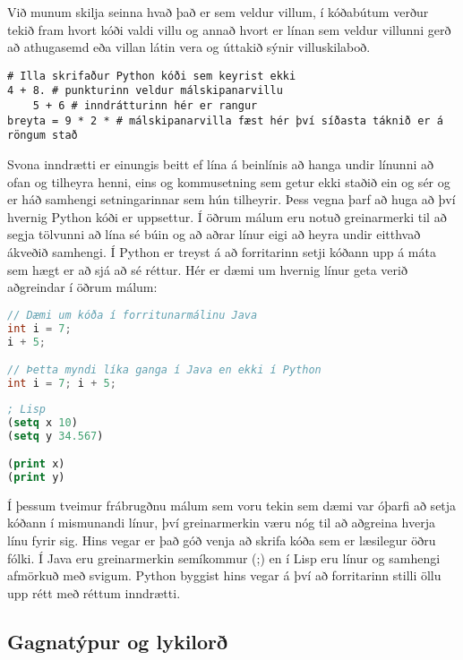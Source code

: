 Við munum skilja seinna hvað það er sem veldur villum, í kóðabútum verður tekið fram hvort kóði valdi villu og annað hvort er línan sem veldur villunni gerð að athugasemd eða villan látin vera og úttakið sýnir villuskilaboð.

\begin{lstlisting}[caption=Rangur Python kóði sem veldur villu, label=lst:inng-malskipanarvilla]
# Illa skrifaður Python kóði sem keyrist ekki
4 + 8. # punkturinn veldur málskipanarvillu
	5 + 6 # inndrátturinn hér er rangur
breyta = 9 * 2 * # málskipanarvilla fæst hér því síðasta táknið er á röngum stað
\end{lstlisting}

Svona inndrætti er einungis beitt ef lína á beinlínis að hanga undir línunni að ofan og tilheyra henni, eins og kommusetning sem getur ekki staðið ein og sér og er háð samhengi setningarinnar sem hún tilheyrir.
Þess vegna þarf að huga að því hvernig Python kóði er uppsettur. 
Í öðrum málum eru notuð greinarmerki til að segja tölvunni að lína sé búin og að aðrar línur eigi að heyra undir eitthvað ákveðið samhengi.
Í Python er treyst á að forritarinn setji kóðann upp á máta sem hægt er að sjá að sé réttur. 
Hér er dæmi um hvernig línur geta verið aðgreindar í öðrum málum:

\begin{lstlisting}[language=Java , caption=Dæmi um annað mál sem er strangt tagað og með greinarmerkjum]
// Dæmi um kóða í forritunarmálinu Java
int i = 7;
i + 5;

// Þetta myndi líka ganga í Java en ekki í Python
int i = 7; i + 5;
\end{lstlisting}

\begin{lstlisting}[language=Lisp, caption=Dæmi um annað mál sem byggir á afmörkuðu samhengi og er með greinarmerkjum]
; Lisp
(setq x 10)
(setq y 34.567)

(print x)
(print y)
\end{lstlisting}

Í þessum tveimur frábrugðnu málum sem voru tekin sem dæmi var óþarfi að setja kóðann í mismunandi línur, því greinarmerkin væru nóg til að aðgreina hverja línu fyrir sig. 
Hins vegar er það góð venja að skrifa kóða sem er læsilegur öðru fólki. Í Java eru greinarmerkin semíkommur (;) en í Lisp eru línur og samhengi afmörkuð með svigum. 
Python byggist hins vegar á því að forritarinn stilli öllu upp rétt með réttum inndrætti. 

\subsection{Gagnatýpur og lykilorð}

